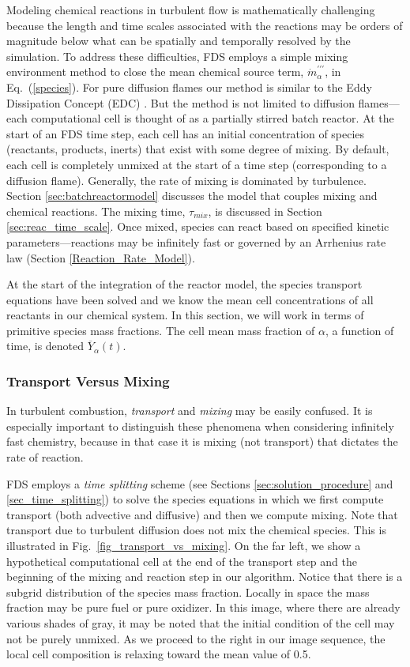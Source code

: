 Modeling chemical reactions in turbulent flow is mathematically challenging because the length and time scales associated with the reactions may be orders of magnitude below what can be spatially and temporally resolved by the simulation. To address these difficulties, FDS employs a simple mixing environment method to close the mean chemical source term, $\dot{m}^{\prime\prime\prime}_{\alpha}$, in Eq.~(\ref{species}).  For pure diffusion flames our method is similar to the Eddy Dissipation Concept (EDC) \cite{Magnussen:1,Poinsot:TNC}. But the method is not limited to diffusion flames---each computational cell is thought of as a partially stirred batch reactor. At the start of an FDS time step, each cell has an initial concentration of species (reactants, products, inerts) that exist with some degree of mixing. By default, each cell is completely unmixed at the start of a time step (corresponding to a diffusion flame). Generally, the rate of mixing is dominated by turbulence. Section \ref{sec:batchreactormodel} discusses the model that couples mixing and chemical reactions. The mixing time, $\tau_{mix}$, is discussed in Section \ref{sec:reac_time_scale}. Once mixed, species can react based on specified kinetic parameters---reactions may be infinitely fast or governed by an Arrhenius rate law (Section \ref{Reaction_Rate_Model}).

At the start of the integration of the reactor model, the species transport equations have been solved and we know the mean cell concentrations of all reactants in our chemical system.  In this section, we will work in terms of primitive species mass fractions.  The cell mean mass fraction of $\alpha$, a function of time, is denoted $\overline{Y}_\alpha(t)$.

\subsubsection{Transport Versus Mixing}

In turbulent combustion, \emph{transport} and \emph{mixing} may be easily confused.  It is especially important to distinguish these phenomena when considering infinitely fast chemistry, because in that case it is mixing (not transport) that dictates the rate of reaction.

FDS employs a \emph{time splitting} scheme (see Sections \ref{sec:solution_procedure} and \ref{sec_time_splitting}) to solve the species equations in which we first compute transport (both advective and diffusive) and then we compute mixing.  Note that transport due to turbulent diffusion does not mix the chemical species.  This is illustrated in Fig.~\ref{fig_transport_vs_mixing}.  On the far left, we show a hypothetical computational cell at the end of the transport step and the beginning of the mixing and reaction step in our algorithm.  Notice that there is a subgrid distribution of the species mass fraction.  Locally in space the mass fraction may be pure fuel or pure oxidizer.  In this image, where there are already various shades of gray, it may be noted that  the initial condition of the cell may not be purely unmixed.  As we proceed to the right in our image sequence, the local cell composition is relaxing toward the mean value of 0.5.

